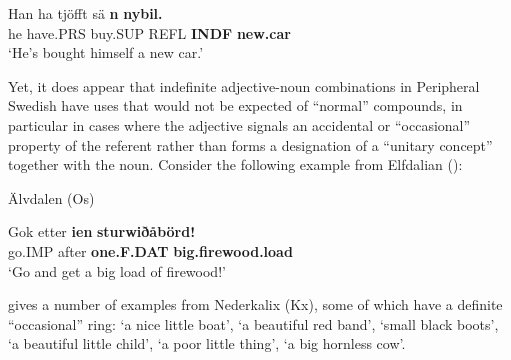  \ea\label{}
\gll Han  ha  tjöfft  sä  \textbf{n}\textbf{  nybil.}\\


he  have.PRS  buy.SUP  REFL  \textbf{INDF} \textbf{new.car}\\

\glt ‘He’s bought himself a new car.’

\z

Yet, it does appear that indefinite adjective-noun combinations in Peripheral Swedish have uses that would not be expected of “normal” compounds, in particular in cases where the adjective signals an accidental or “occasional” property of the referent rather than forms a designation of a “unitary concept” together with the noun. Consider the following example from Elfdalian (\citet[142]{Levander1909}):


\item 

Älvdalen (Os)



 \ea\label{}
\gll Gok  etter  \textbf{ien} \textbf{sturwiðåbörd!}\\


go.IMP  after  \textbf{one.F.DAT} \textbf{big.firewood.load}\\

\glt ‘Go and get a big load of firewood!’ 

\z

\citet[141]{Rutberg1924} gives a number of examples from Nederkalix (Kx), some of which have a definite “occasional” ring: ‘a nice little boat’,  ‘a beautiful red band’,  ‘small black boots’,  ‘a beautiful little child’,  ‘a poor little thing’,  ‘a big hornless cow’.


